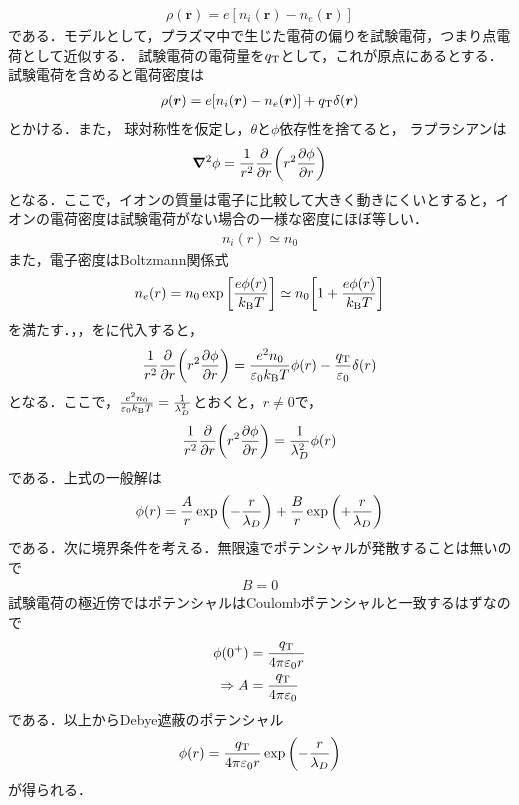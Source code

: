 \documentclass{report}
\begin{document}
    \begin{align}
      \rho(\bm{r}) = e[n_i(\bm{r}) - n_e(\bm{r})]
    \end{align}
    である．モデルとして，プラズマ中で生じた電荷の偏りを試験電荷，つまり点電荷として近似する．
    試験電荷の電荷量を$q_{\mathrm{T}}$として，これが原点にあるとする．
    試験電荷を含めると電荷密度は
    \begin{align}
      \rho(\bm{r}) = e[n_i(\bm{r}) - n_e(\bm{r})] + q_{\mathrm{T}}\delta(\bm{r}) \label{density-charge}
    \end{align}
    とかける．また，
    球対称性を仮定し，$\theta$と$\phi$依存性を捨てると，
    ラプラシアンは
    \begin{align}
      \grad^2\phi = \frac{1}{r^2}\pdv{r} \qty(r^2 \pdv{\phi}{r})
    \end{align}
    となる．ここで，イオンの質量は電子に比較して大きく動きにくいとすると，イオンの電荷密度は試験電荷がない場合の一様な密度にほぼ等しい．
    \begin{align}
      n_i(r) \simeq n_0 \label{density-ion}
    \end{align}
    また，電子密度はBoltzmann関係式
    \begin{align}
      n_e(r) = n_0\exp\qty[\frac{e\phi(r)}{k_{\mathrm{B}} T}] \simeq n_0\qty[1 + \frac{e\phi(r)}{k_{\mathrm{B}} T}] \label{density-e}
    \end{align}
    を満たす．，，をに代入すると，
    \begin{align}
      \frac{1}{r^2}\pdv{r}\qty(r^2\pdv{\phi}{r}) = \frac{e^2 n_0}{\varepsilon_0 k_{\mathrm{B}} T}\phi(r) - \frac{q_{\mathrm{T}}}{\varepsilon_0}\delta(r)
    \end{align}
    となる．ここで，$\frac{e^2 n_0}{\varepsilon_0 k_{\mathrm{B}} T} = \frac{1}{\lambda_D^2}$とおくと，$r \neq 0$で，
    \begin{align}
      \frac{1}{r^2}\pdv{r}\qty(r^2\pdv{\phi}{r}) = \frac{1}{\lambda_D^2}\phi(r)
    \end{align}
    である．上式の一般解は
    \begin{align}
      \phi(r) = \frac{A}{r}\exp\qty(-\frac{r}{\lambda_D}) + \frac{B}{r}\exp\qty(+\frac{r}{\lambda_D})
    \end{align}
    である．次に境界条件を考える．無限遠でポテンシャルが発散することは無いので
    \begin{align}
      B = 0
    \end{align}
    試験電荷の極近傍ではポテンシャルはCoulombポテンシャルと一致するはずなので
    \begin{align}
      \phi(0^{+}) &= \frac{q_{\mathrm{T}}}{4\pi\varepsilon_0 r}\\
      \Rightarrow A&= \frac{q_{\mathrm{T}}}{4\pi\varepsilon_0}
    \end{align}
    である．以上からDebye遮蔽のポテンシャル
    \begin{align}
      \phi(r) = \frac{q_{\mathrm{T}}}{4\pi\varepsilon_0 r}\exp\qty(-\frac{r}{\lambda_D})
    \end{align}
    が得られる．
\end{document}

